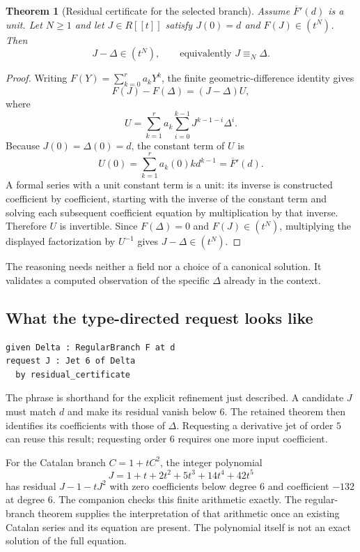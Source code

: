 \documentclass[11pt,a4paper]{article}
\newcommand{\code}[1]{\texttt{\detokenize{#1}}}
\theoremstyle{plain}
\newtheorem{theorem}{Theorem}[section]
\theoremstyle{definition}
\begin{document}
\begin{theorem}[Residual certificate for the selected branch]\label{thm:residual}
Assume $\overline F'(d)$ is a unit. Let $N\ge1$ and let $J\in R[[t]]$ satisfy $J(0)=d$ and $F(J)\in(t^N)$. Then
\[
 J-\Delta\in(t^N),\qquad\text{equivalently }J\equiv_N\Delta.
\]
\end{theorem}
\begin{proof}
Writing $F(Y)=\sum_{k=0}^r a_kY^k$, the finite geometric-difference identity gives
\[
 F(J)-F(\Delta)=(J-\Delta)U,
\]
where
\[
 U=\sum_{k=1}^r a_k\sum_{i=0}^{k-1}J^{k-1-i}\Delta^i.
\]
Because $J(0)=\Delta(0)=d$, the constant term of $U$ is
\[
 U(0)=\sum_{k=1}^r a_k(0)k d^{k-1}=\overline F'(d).
\]
A formal series with a unit constant term is a unit: its inverse is constructed coefficient by coefficient, starting with the inverse of the constant term and solving each subsequent coefficient equation by multiplication by that inverse. Therefore $U$ is invertible. Since $F(\Delta)=0$ and $F(J)\in(t^N)$, multiplying the displayed factorization by $U^{-1}$ gives $J-\Delta\in(t^N)$.
\end{proof}
The reasoning needs neither a field nor a choice of a canonical solution. It validates a computed observation of the specific $\Delta$ already in the context.

\subsection{What the type-directed request looks like}
\par\noindent\begin{minipage}{\linewidth}
\begin{lstlisting}
given Delta : RegularBranch F at d
request J : Jet 6 of Delta
  by residual_certificate
\end{lstlisting}
\end{minipage}\par
The phrase \code{RegularBranch} is shorthand for the explicit refinement just described. A candidate $J$ must match $d$ and make its residual vanish below $6$. The retained theorem then identifies its coefficients with those of $\Delta$. Requesting a derivative jet of order $5$ can reuse this result; requesting order $6$ requires one more input coefficient.

For the Catalan branch $C=1+tC^2$, the integer polynomial
\[
 J=1+t+2t^2+5t^3+14t^4+42t^5
\]
has residual $J-1-tJ^2$ with zero coefficients below degree $6$ and coefficient $-132$ at degree $6$. The companion checks this finite arithmetic exactly. The regular-branch theorem supplies the interpretation of that arithmetic once an existing Catalan series and its equation are present. The polynomial itself is not an exact solution of the full equation.
\end{document}
